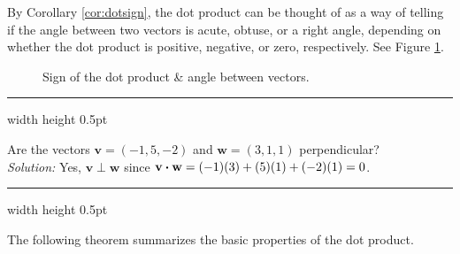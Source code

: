 By Corollary \ref{cor:dotsign}, the dot product can be thought of as a way of telling if the angle between two vectors
is acute, obtuse, or a right angle, depending on whether the dot product is positive, negative, or zero,
respectively. See Figure \ref{fig:dotsign}.

\begin{figure}[h]
 \centering
 \qquad\qquad
 \qquad\qquad
 \caption[]{\quad Sign of the dot product \& angle between vectors.}
 \label{fig:dotsign}
\end{figure}

\hrule width \textwidth height 0.5pt
\begin{exmp}
 Are the vectors $\mathbf{v} = (-1,5,-2)$ and $\mathbf{w} = (3,1,1)$ perpendicular?\smallskip\\\emph{Solution:}
 Yes, $\mathbf{v} \perp \mathbf{w}$ since $\mathbf{v} \bm{\cdot} \mathbf{w} = (-1)(3) + (5)(1) + (-2)(1) = 0$.
\end{exmp}
\hrule width \textwidth height 0.5pt
\medskip

The following theorem summarizes the basic properties of the dot product.

